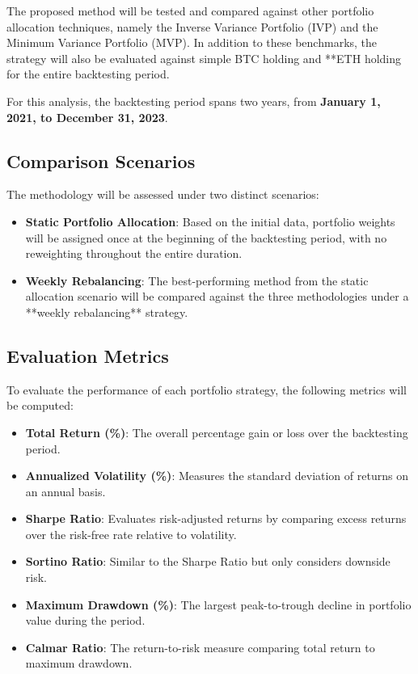 \documentclass[english]{maciarticle}
\begin{document}
The proposed method will be tested and compared against other portfolio allocation techniques, namely the Inverse Variance Portfolio (IVP) and the Minimum Variance Portfolio (MVP). In addition to these benchmarks, the strategy will also be evaluated against simple BTC holding and **ETH holding for the entire backtesting period.

For this analysis, the backtesting period spans two years, from \textbf{January 1, 2021, to December 31, 2023}.

\subsection{Comparison Scenarios}

The methodology will be assessed under two distinct scenarios:

\begin{itemize}
    \item \textbf{Static Portfolio Allocation}: Based on the initial data, portfolio weights will be assigned once at the beginning of the backtesting period, with no reweighting throughout the entire duration.
    \item \textbf{Weekly Rebalancing}: The best-performing method from the static allocation scenario will be compared against the three methodologies under a **weekly rebalancing** strategy.
\end{itemize}

\subsection{Evaluation Metrics}

To evaluate the performance of each portfolio strategy, the following metrics will be computed:

\begin{itemize}
    \item \textbf{Total Return (\%)}: The overall percentage gain or loss over the backtesting period.
    \item \textbf{Annualized Volatility (\%)}: Measures the standard deviation of returns on an annual basis.
    \item \textbf{Sharpe Ratio}: Evaluates risk-adjusted returns by comparing excess returns over the risk-free rate relative to volatility.
    \item \textbf{Sortino Ratio}: Similar to the Sharpe Ratio but only considers downside risk.
    \item \textbf{Maximum Drawdown (\%)}: The largest peak-to-trough decline in portfolio value during the period.
    \item \textbf{Calmar Ratio}: The return-to-risk measure comparing total return to maximum drawdown.
\end{itemize}
\end{document}
